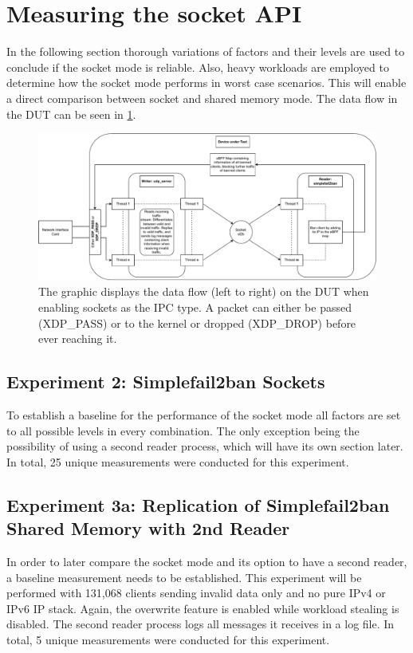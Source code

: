 \section{Measuring the socket API}
In the following section thorough variations of factors and their levels are used to conclude if the socket mode is reliable.
Also, heavy workloads are employed to determine how the socket mode performs in worst case scenarios.
This will enable a direct comparison between socket and shared memory mode.
The data flow in the DUT can be seen in \ref{fig:socket:measurement}.

\begin{figure}[h!]
    \centerline{\includegraphics[width=1.2\textwidth]{images/MeasurementArchitecture.pdf}}
    \caption[DUT during socket measurements]{
        The graphic displays the data flow (left to right) on the DUT when enabling sockets as the IPC type.
        A packet can either be passed (XDP\_PASS) or to the kernel or dropped (XDP\_DROP) before ever reaching it.}
	\label{fig:socket:measurement}
\end{figure}


\subsection{Experiment 2: Simplefail2ban Sockets}
To establish a baseline for the performance of the socket mode all factors are set to all possible levels in every combination.
The only exception being the possibility of using a second reader process, which will have its own section later.
In total, 25 unique measurements were conducted for this experiment.

\subsection{Experiment 3a: Replication of Simplefail2ban Shared Memory with 2nd Reader}
In order to later compare the socket mode and its option to have a second reader, a baseline measurement needs to be established.
This experiment will be performed with 131,068 clients sending invalid data only and no pure IPv4 or IPv6 IP stack.
Again, the overwrite feature is enabled while workload stealing is disabled.
The second reader process logs all messages it receives in a log file.
In total, 5 unique measurements were conducted for this experiment.

